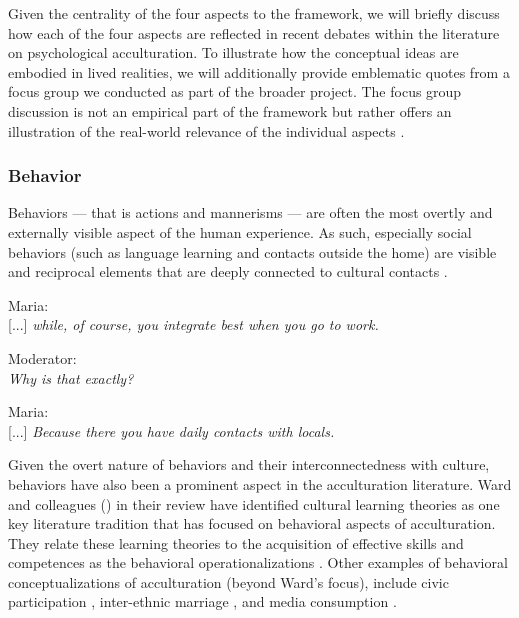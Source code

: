 \documentclass[man, 12pt, a4paper, mask]{apa7}
\begin{document}
Given the centrality of the four aspects to the framework, we will briefly discuss how each of the four aspects are reflected in recent debates within the literature on psychological acculturation. To illustrate how the conceptual ideas are embodied in lived realities, we will additionally provide emblematic quotes from a focus group we conducted as part of the broader project. The focus group discussion is not an empirical part of the framework but rather offers an illustration of the real-world relevance of the individual aspects \citep[the full account of the focus group discussion is available as a separate publication by ][]{kreienkamp2023Blinded}.

\subsubsection{Behavior}
Behaviors --- that is actions and mannerisms --- are often the most overtly and externally visible aspect of the human experience. As such, especially social behaviors (such as language learning and contacts outside the home) are visible and reciprocal elements that are deeply connected to cultural contacts \citep[e.g.,][]{Legare2019, Whiting1980, imai2016}.

\begin{displayquote}
    Maria:\\
    {[...]} \textit{while, of course, you integrate best when you go to work.}
    
    Moderator:\\
    \textit{Why is that exactly?}
    
    Maria:\\
    {[...]} \textit{Because there you have daily contacts with locals.}
\end{displayquote}

Given the overt nature of behaviors and their interconnectedness with culture, behaviors have also been a prominent aspect in the acculturation literature. Ward and colleagues (\citeyear{Ward2019}) in their review have identified cultural learning theories as one key literature tradition that has focused on behavioral aspects of acculturation. They relate these learning theories to the acquisition of effective skills and competences as the behavioral operationalizations \citep[including, verbal and non-verbal communication skills][]{Ward2001}. Other examples of behavioral conceptualizations of acculturation (beyond Ward's focus), include civic participation \citep[e.g., voting;][]{Lessard-Phillips2020}, inter-ethnic marriage \citep[e.g.,][]{Song2009}, and media consumption \citep[e.g.,][]{Shoemaker1985}. 
\end{document}
